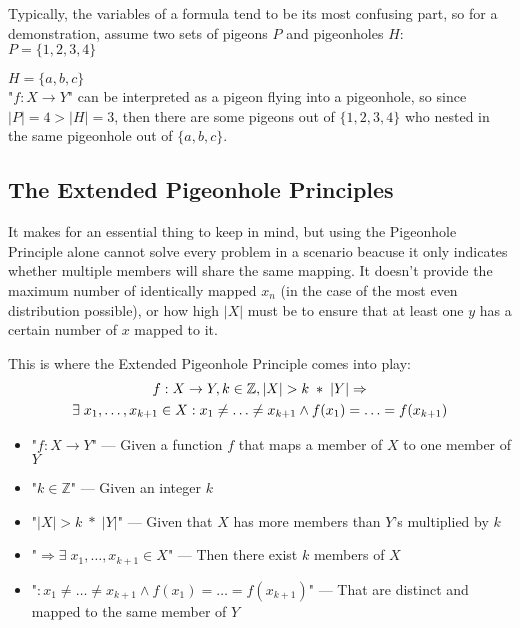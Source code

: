\documentclass{article}
\begin{document}
Typically, the variables of a formula tend to be its most confusing part, so for a demonstration, assume two sets of pigeons $P$ and pigeonholes $H$:\\

$P=\{1, 2, 3, 4\}$

$H=\{a, b, c\}$\\

"$f: X \rightarrow Y$" can be interpreted as a pigeon flying into a pigeonhole, so since $|P|=4>|H|=3$, then there are some pigeons out of $\{1, 2, 3, 4\}$ who nested in the same pigeonhole out of $\{a, b, c\}$.

\subsection{The Extended Pigeonhole Principles}

It makes for an essential thing to keep in mind, but using the Pigeonhole Principle alone cannot solve every problem in a scenario beacuse it only indicates whether multiple members will share the same mapping. It doesn't provide the maximum number of identically mapped $x_n$ (in the case of the most even distribution possible), or how high $|X|$ must be to ensure that at least one $y$ has a certain number of $x$ mapped to it.

This is where the Extended Pigeonhole Principle comes into play:
\begin{gather}
  f: X \rightarrow Y, k \in \mathbb{Z}, |X| > k \; * \; |Y| \Rightarrow \notag \\ \exists \; x_1, \ldots, x_{k+1} \in X: x_1 \neq \ldots \neq x_{k+1} \land f(x_1) = \ldots = f(x_{k+1})
\end{gather}

\begin{itemize}
\item "$f: X \rightarrow Y$" --- Given a function $f$ that maps a member of $X$ to one member of $Y$
\item "$k \in \mathbb{Z}$" --- Given an integer $k$
\item "$|X| > k \; * \; |Y|$" --- Given that $X$ has more members than $Y$'s multiplied by $k$
\item "$\Rightarrow \exists \; x_1, \ldots, x_{k+1} \in X$" --- Then there exist $k$ members of $X$
\item "$: x_1 \neq \ldots \neq x_{k+1} \land f(x_1) = \ldots = f(x_{k+1})$" --- That are distinct and mapped to the same member of $Y$
\end{itemize}
\end{document}
